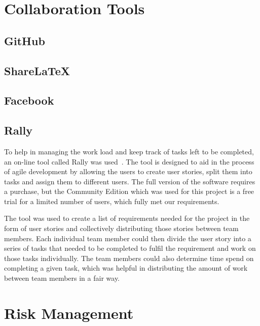 \section{Collaboration Tools}
    \subsection{GitHub}
    
    \subsection{ShareLaTeX}
    
    \subsection{Facebook}
    
    \subsection{Rally}
        To help in managing the work load and keep track of tasks left to be completed, an on-line tool called Rally was used~\cite{rally}. The tool is designed to aid in the process of agile development by allowing the users to create user stories, split them into tasks and assign them to different users. The full version of the software requires a purchase, but the Community Edition which was used for this project is a free trial for a limited number of users, which fully met our requirements.
    
        The tool was used to create a list of requirements needed for the project in the form of user stories and collectively distributing those stories between team members. Each individual team member could then divide the user story into a series of tasks that needed to be completed to fulfil the requirement and work on those tasks individually. The team members could also determine time spend on completing a given task, which was helpful in distributing the amount of work between team members in a fair way.

\section{Risk Management}

